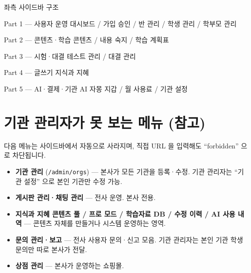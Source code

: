 
\begin{screenbox}{좌측 사이드바 구조}
\begin{minipage}[t]{0.32\linewidth}
\begin{screencard}{Part 1 — 사용자 운영}
대시보드 / 가입 승인 / 반 관리 / 학생 관리 / 학부모 관리
\end{screencard}
\end{minipage}\hfill
\begin{minipage}[t]{0.32\linewidth}
\begin{screencard}{Part 2 — 콘텐츠·학습}
콘텐츠 / 내용 숙지 / 학습 계획표
\end{screencard}
\end{minipage}\hfill
\begin{minipage}[t]{0.32\linewidth}
\begin{screencard}{Part 3 — 시험·대결}
테스트 관리 / 대결 관리
\end{screencard}
\end{minipage}

\medskip
\begin{minipage}[t]{0.48\linewidth}
\begin{screencard}{Part 4 — 글쓰기}
지식과 지혜
\end{screencard}
\end{minipage}\hfill
\begin{minipage}[t]{0.48\linewidth}
\begin{screencard}{Part 5 — AI·결제·기관}
AI 자몽 지갑 / 월 사용료 / 기관 설정
\end{screencard}
\end{minipage}
\end{screenbox}

\section*{기관 관리자가 못 보는 메뉴 (참고)}

다음 메뉴는 사이드바에서 자동으로 사라지며, 직접 URL 을 입력해도 ``forbidden'' 으로 차단됩니다.

\begin{itemize}[leftmargin=1.2em]
  \item \textbf{기관 관리} (\texttt{/admin/orgs}) — 본사가 모든 기관을 등록·수정. 기관 관리자는 ``기관 설정'' 으로 본인 기관만 수정 가능.
  \item \textbf{게시판 관리·채팅 관리} — 전사 운영. 본사 전용.
  \item \textbf{지식과 지혜 콘텐츠 풀 / 프로 모드 / 학습자료 DB / 수정 이력 / AI 사용 내역} — 콘텐츠 자체를 만들거나 시스템 운영하는 영역.
  \item \textbf{문의 관리·보고} — 전사 사용자 문의·신고 모음. 기관 관리자는 본인 기관 학생 문의만 따로 본사가 전달.
  \item \textbf{상점 관리} — 본사가 운영하는 쇼핑몰.
\end{itemize}

